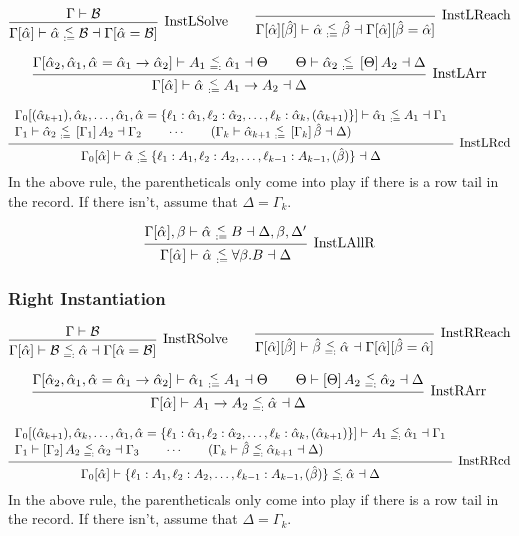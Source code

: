 \documentclass{article}
\newcommand{\B}{\mathcal{B}}
\newcommand{\instLSymbol}{\;\substack{<\\:=}\;}
\newcommand{\instRSymbol}{\;\substack{<\\=:}\;}
\newcommand{\ev}{\hat}
\newcommand{\spc}{\qquad}
\newcommand{\apply}[1]{\left[#1\right]}
\newcommand{\eva}[1][]{\ev \alpha_{#1}}
\newcommand{\evb}{\ev \beta}
\newcommand{\instL}[4]{#1 \vdash #2 \instLSymbol #3 \dashv #4}
\newcommand{\instR}[4]{#1 \vdash #2 \instRSymbol #3 \dashv #4}
\newcommand{\deduct}[3][]
{
  \begin{prooftree}
    \hypo{#2}
    \infer1[\text{#1}]{#3}
  \end{prooftree}
}
\begin{document}
\[
  \deduct[InstLSolve]
  {\Gamma \vdash \B}
  {\instL{\Gamma[\ev\alpha]}{\ev \alpha}{\B}{\Gamma[\ev\alpha = \B]}}
  \spc
  \deduct[InstLReach]
  {}
  {\instL{\Gamma[\ev\alpha][\ev\beta]}{\ev \alpha}{\ev
      \beta}{\Gamma[\ev\alpha][\ev\beta = \ev\alpha]}}
\]

\[
  \deduct[InstLArr] {\instR{\Gamma[\eva[2], \eva[1], \eva = \eva[1] \to
      \eva[2]]}{A_1}{\eva[1]}{\Theta} \spc \instL{\Theta}{\eva[2]}{\apply \Theta
      A_2}{\Delta} } {\instL{\Gamma[\eva]}{\eva}{A_1 \to A_2}{\Delta}}
\]

\[
  \deduct[InstLRcd]
  {
    \begin{array}{l}
     \instL{\Gamma_0[(\eva[k+1]), \eva[k], \dots, \eva[1], \eva=\{\ell_1 : \eva[1],
      \ell_2 : \eva[2], \dots, \ell_k : \eva[k], (\eva[k+1])\}]}{\eva[1]}{A_1}{\Gamma_1} \\
    \instL{\Gamma_1}{\eva[2]}{\apply{\Gamma_1} A_2}{\Gamma_2} \spc \cdots \spc
     (\instL{\Gamma_k}{\eva[k+1]}{\apply{\Gamma_k}\evb}{\Delta})
  \end{array}
  }
  {\instL{\Gamma_0[\eva]}{\eva}{\{\ell_1:A_1, \ell_2 : A_2, \dots, \ell_{k-1} : A_{k-1}, (\evb)\}}{\Delta}}
\]
In the above rule, the parentheticals only come into play if there is a row tail
in the record. If there isn't, assume that \(\Delta = \Gamma_k\).

\[
  \deduct[InstLAllR]
  { \instL{\Gamma[\eva], \beta}{\eva}{B}{\Delta, \beta, \Delta'} }
  { \instL{\Gamma[\eva]}{\eva}{\forall \beta. B}{\Delta} }
\]

\subsubsection{Right Instantiation}

\[
  \deduct[InstRSolve]
  {\Gamma \vdash \B}
  {\instR{\Gamma[\ev\alpha]}{\B}{\ev \alpha}{\Gamma[\ev\alpha = \B]}}
  \spc
  \deduct[InstRReach]
  {}
  {\instR{\Gamma[\ev\alpha][\ev\beta]}{\ev
      \beta}{\eva}{\Gamma[\ev\alpha][\ev\beta = \ev\alpha]}}
\]

\[
  \deduct[InstRArr] {\instL{\Gamma[\eva[2], \eva[1], \eva = \eva[1] \to
      \eva[2]]}{\eva[1]}{A_1}{\Theta} \spc \instR{\Theta}{\apply \Theta
      A_2}{\eva[2]}{\Delta} } {\instR{\Gamma[\eva]}{A_1 \to A_2}{\eva}{\Delta}}
\]

\[
  \deduct[InstRRcd]
  {
    \begin{array}{l}
     \instR{\Gamma_0[(\eva[k+1]), \eva[k], \dots, \eva[1], \eva=\{\ell_1 : \eva[1],
      \ell_2 : \eva[2], \dots, \ell_k : \eva[k], (\eva[k+1])\}]}{A_1}{\eva[1]}{\Gamma_1} \\
    \instR{\Gamma_1}{\apply{\Gamma_2} A_2}{\eva[2]}{\Gamma_3} \spc \cdots \spc
     (\instR{\Gamma_k}{\evb}{\eva[k+1]}{\Delta})
  \end{array}
  }
  {\instR{\Gamma_0[\eva]}{\{\ell_1:A_1, \ell_2 : A_2, \dots, \ell_{k-1} : A_{k-1}, (\evb)\}}{\eva}{\Delta}}
\]
In the above rule, the parentheticals only come into play if there is a row tail
in the record. If there isn't, assume that \(\Delta = \Gamma_k\).
\end{document}
